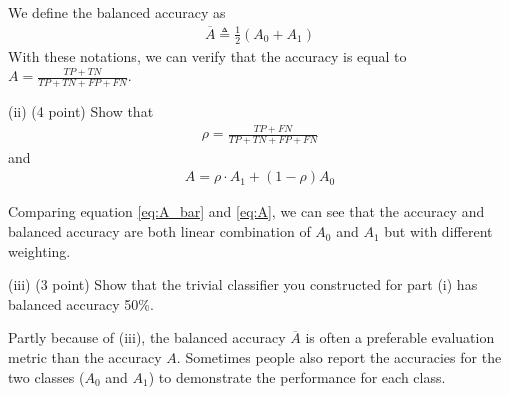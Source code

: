 We define the balanced accuracy as 
\begin{align}
\overline{A} \triangleq \frac{1}{2} \left(A_0+A_1\right)
\label{eq:A_bar}
\end{align}
With these notations, we can verify that the accuracy is equal to $
A =\frac{TP+TN}{TP+TN + FP+FN} $. 

(ii) (4 point) Show that 
\begin{align*}
\rho = \frac{TP + FN}{TP+TN + FP+FN}
\end{align*}
and 
\begin{align}
A = \rho \cdot A_1 + (1-\rho)A_0
\label{eq:A}
\end{align}


Comparing equation \eqref{eq:A_bar} and \eqref{eq:A}, we can see that the accuracy and balanced accuracy are both linear combination of $A_0$ and $A_1$ but with different weighting. 

(iii) (3 point) Show that the trivial classifier you constructed for part (i) has balanced accuracy 50\%. 

Partly because of (iii), the balanced accuracy $\overline{A}$ is often a preferable evaluation metric than the accuracy $A$. Sometimes people also report the accuracies for the two classes ($A_0$ and $A_1$) to demonstrate the performance for each class. 